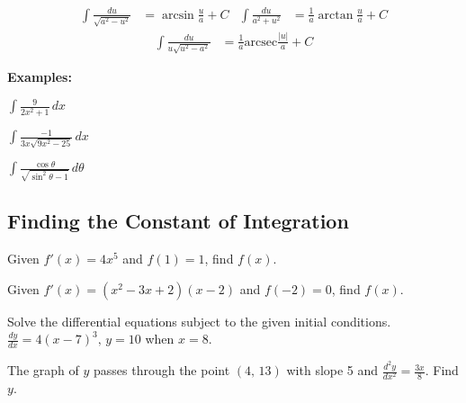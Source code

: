 \documentclass[addpoints, 12pt]{exam}
\begin{document}
\newpage

\begin{tcolorbox}[title= INTEGRALS OF INVERSE TRIG FUNCTIONS,black,sharp corners,colback=white,colbacktitle=white,coltitle=black,boxrule=1pt]

    \begin{align*}
        \displaystyle\int\frac{du}{\sqrt{a^2-u^2}} &= \arcsin\frac{u}{a}+C & \displaystyle\int\frac{du}{a^2+u^2} &= \displaystyle\frac{1}{a}\arctan\frac{u}{a}+C 
    \end{align*}
    \begin{align*}
        \displaystyle\int\frac{du}{u\sqrt{u^2-a^2}} &= \frac{1}{a}\text{arcsec}\frac{|u|}{a} +C
    \end{align*}
\end{tcolorbox}
\textbf{Examples:}
\begin{questions}
    \question $\displaystyle\int\frac{9}{2x^2+1}\,dx$
    
    \question $\displaystyle\int\frac{-1}{3x\sqrt{9x^2-25}}\,dx$
    
    \question $\displaystyle\int\frac{\cos\theta}{\sqrt{\sin^2\theta-1}}\,d\theta$
\end{questions}


\newpage
{}
\subsection*{Finding the Constant of Integration}

\begin{questions}
    \question Given $f'(x)=4x^5$ and $f(1)=1$, find $f(x)$.
    
    \question Given $f'(x)=(x^2-3x+2)(x-2)$ and $f(-2)=0$, find $f(x)$.
    
    Solve the differential equations subject to the given initial conditions.
    \question $\displaystyle\frac{dy}{dx}=4(x-7)^3,\,y=10$ when $x=8$.
    
    \question The graph of $y$ passes through the point $(4,\,13)$ with slope 5 and $\displaystyle\frac{d^2y}{dx^2}=\frac{3x}{8}$. Find $y$.
\end{questions}
\end{document}
